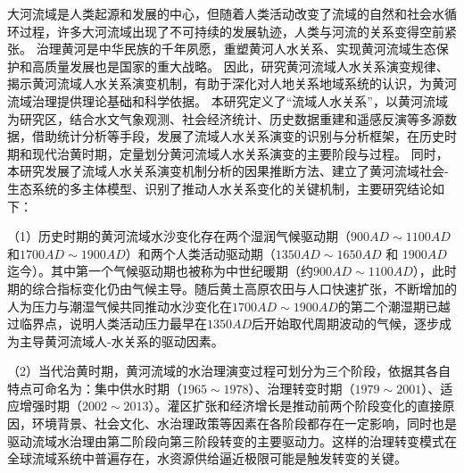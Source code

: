 \begin{cabstract}



大河流域是人类起源和发展的中心，但随着人类活动改变了流域的自然和社会水循环过程，许多大河流域出现了不可持续的发展轨迹，人类与河流的关系变得空前紧张。
治理黄河是中华民族的千年夙愿，重塑黄河人水关系、实现黄河流域生态保护和高质量发展也是国家的重大战略。
因此，研究黄河流域人水关系演变规律、揭示黄河流域人水关系演变机制，有助于深化对人地关系地域系统的认识，为黄河流域治理提供理论基础和科学依据。
本研究定义了“流域人水关系”，以黄河流域为研究区，结合水文气象观测、社会经济统计、历史数据重建和遥感反演等多源数据，借助统计分析等手段，发展了流域人水关系演变的识别与分析框架，在历史时期和现代治黄时期，定量划分黄河流域人水关系演变的主要阶段与过程。
同时，本研究发展了流域人水关系演变机制分析的因果推断方法、建立了黄河流域社会-生态系统的多主体模型、识别了推动人水关系变化的关键机制，主要研究结论如下：

（1）历史时期的黄河流域水沙变化存在两个湿润气候驱动期（$900AD\sim1100AD$和$1700AD\sim1900AD$）和两个人类活动驱动期（$1350AD \sim 1650AD$ 和 $1900AD$迄今）。其中第一个气候驱动期也被称为中世纪暖期（约$900AD \sim 1100AD$），此时期的综合指标变化仍由气候主导。随后黄土高原农田与人口快速扩张，不断增加的人为压力与潮湿气候共同推动水沙变化在$1700AD \sim 1900AD$的第二个潮湿期已越过临界点，说明人类活动压力最早在$1350AD$后开始取代周期波动的气候，逐步成为主导黄河流域人-水关系的驱动因素。

（2）当代治黄时期，黄河流域的水治理演变过程可划分为三个阶段，依据其各自特点可命名为：集中供水时期（$1965 \sim 1978$）、治理转变时期（$1979 \sim 2001$）、适应增强时期（$2002 \sim 2013$）。灌区扩张和经济增长是推动前两个阶段变化的直接原因，环境背景、社会文化、水治理政策等因素在各阶段都存在一定影响，同时也是驱动流域水治理由第二阶段向第三阶段转变的主要驱动力。这样的治理转变模式在全球流域系统中普遍存在，水资源供给逼近极限可能是触发转变的关键。


\end{cabstract}

